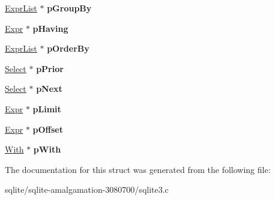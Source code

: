 \begin{DoxyCompactItemize}
\item 
\hypertarget{struct_select_a5b625c7495468ae56ca2f214a76231a0}{\hyperlink{struct_expr_list}{Expr\+List} $\ast$ {\bfseries p\+Group\+By}}\label{struct_select_a5b625c7495468ae56ca2f214a76231a0}

\item 
\hypertarget{struct_select_ad09e0b115e6e1599e3075b87dfa6e66e}{\hyperlink{struct_expr}{Expr} $\ast$ {\bfseries p\+Having}}\label{struct_select_ad09e0b115e6e1599e3075b87dfa6e66e}

\item 
\hypertarget{struct_select_a73c474cd4a9a9b9aa4e3187d8bf2d886}{\hyperlink{struct_expr_list}{Expr\+List} $\ast$ {\bfseries p\+Order\+By}}\label{struct_select_a73c474cd4a9a9b9aa4e3187d8bf2d886}

\item 
\hypertarget{struct_select_a51d1a253b0aba5a54b11b3bf3896d056}{\hyperlink{struct_select}{Select} $\ast$ {\bfseries p\+Prior}}\label{struct_select_a51d1a253b0aba5a54b11b3bf3896d056}

\item 
\hypertarget{struct_select_a96aa0caf60390b8f5e88589639205c40}{\hyperlink{struct_select}{Select} $\ast$ {\bfseries p\+Next}}\label{struct_select_a96aa0caf60390b8f5e88589639205c40}

\item 
\hypertarget{struct_select_a11d3b48d04d58be818cdefb10aa061a0}{\hyperlink{struct_expr}{Expr} $\ast$ {\bfseries p\+Limit}}\label{struct_select_a11d3b48d04d58be818cdefb10aa061a0}

\item 
\hypertarget{struct_select_aeaf016a10203b911000354122562fb46}{\hyperlink{struct_expr}{Expr} $\ast$ {\bfseries p\+Offset}}\label{struct_select_aeaf016a10203b911000354122562fb46}

\item 
\hypertarget{struct_select_a3ab5597bdc6b219ea03a6aca93260e9f}{\hyperlink{struct_with}{With} $\ast$ {\bfseries p\+With}}\label{struct_select_a3ab5597bdc6b219ea03a6aca93260e9f}

\end{DoxyCompactItemize}


The documentation for this struct was generated from the following file\+:\begin{DoxyCompactItemize}
\item 
sqlite/sqlite-\/amalgamation-\/3080700/sqlite3.\+c\end{DoxyCompactItemize}
